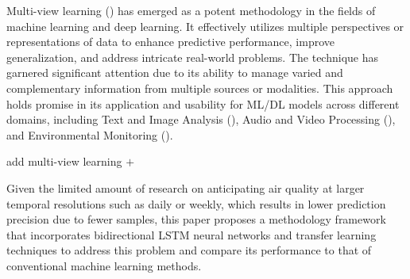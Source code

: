 \documentclass[a4paper,fleqn]{cas-sc}
\begin{document}
Multi-view learning (\cite{zhao2017multi,xu2013survey}) has emerged as a potent methodology in the fields of machine learning and deep learning. It effectively utilizes multiple perspectives or representations of data to enhance predictive performance, improve generalization, and address intricate real-world problems. The technique has garnered significant attention due to its ability to manage varied and complementary information from multiple sources or modalities. This approach holds promise in its application and usability for ML/DL models across different domains, including Text and Image Analysis (\cite{yang2020image,nie2017auto}), Audio and Video Processing (\cite{garcia2018multi,hussain2021comprehensive}), and Environmental Monitoring (\cite{huang2017multi}).

\par add multi-view learning $+$


Given the limited amount of research on anticipating air quality at larger temporal resolutions such as daily or weekly, which results in lower prediction precision due to fewer samples, this paper proposes a methodology framework that incorporates bidirectional LSTM neural networks and transfer learning techniques to address this problem and compare its performance to that of conventional machine learning methods.
\end{document}
